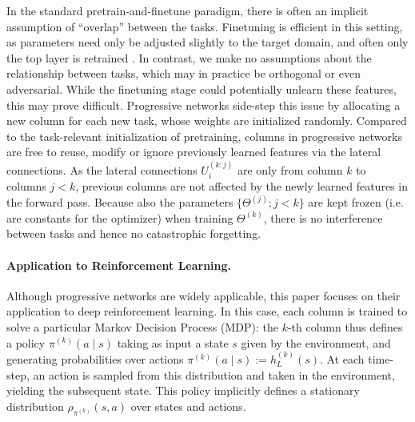 \documentclass{article}
\begin{document}
In the standard pretrain-and-finetune paradigm, there is often an implicit
assumption of ``overlap'' between the tasks. Finetuning is efficient in this
setting, as parameters need only be adjusted slightly to
the target domain, and often only the top layer is retrained \cite{yosinski-nips2014}. In contrast, we make no assumptions about the
relationship between tasks, which may in practice be orthogonal or even
adversarial. While the finetuning stage could potentially unlearn these
features, this may prove difficult. Progressive networks side-step
this issue by allocating a new column for each new task, whose weights are
initialized randomly. Compared to the task-relevant initialization of pretraining,
columns in progressive networks are free to reuse, modify or ignore previously
learned features via the lateral connections.
As the lateral connections $U_{i}^{(k:j)}$ are only from column $k$ to columns
$j < k$, previous columns are not affected by the newly learned features in the
forward pass.  Because also the parameters $\{ \Theta^{(j)}; j<k\}$
are kept frozen (i.e. are constants for the optimizer) when training $\Theta^{(k)}$,
there is no interference between
tasks and hence no catastrophic forgetting.

\paragraph{Application to Reinforcement Learning.} Although progressive
networks are widely applicable, this paper focuses on their application to
deep reinforcement learning. In this case, each column is trained to solve a
particular Markov Decision Process (MDP): the $k$-th column thus defines a policy
$\pi^{(k)}(a\mid s)$ taking as input a state $s$ given by the environment,
and generating probabilities over actions $\pi^{(k)}(a\mid s) := h_L^{(k)}(s)$.
At each time-step, an action is sampled from this distribution and taken in the
environment, yielding the subsequent state. This policy implicitly defines a
stationary distribution $\rho_{\pi^{(k)}}(s,a)$ over states and actions.
\end{document}

